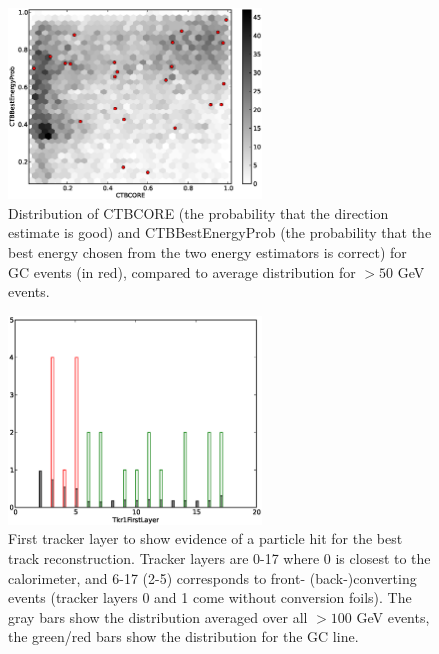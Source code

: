 \documentclass[aps,twocolumn,prd,superscriptaddress,showpacs,nofootinbib,fixfloat]{revtex4}
\begin{document}
\begin{figure}
\centering
\includegraphics[width=0.6\textwidth]{plots/CTBCORE_CTBBestEnergyProb.eps}
\caption{Distribution of CTBCORE (the probability that the direction estimate
is good) and CTBBestEnergyProb (the probability that the best energy chosen
from the two energy estimators is correct) for GC events (in red), compared to
average distribution for $>50$ GeV events.}
\label{fig:CTBquality}
\end{figure}

\begin{figure}
\centering
\includegraphics[width=0.6\textwidth]{plots/Tkr1FirstLayer.eps}
\caption{First tracker layer to show evidence of a particle hit for the best
track reconstruction. Tracker layers are 0-17 where 0 is closest to the
calorimeter, and 6-17 (2-5) corresponds to front- (back-)converting events
(tracker layers 0 and 1 come without conversion foils). The gray bars show the
distribution averaged over all $>100$ GeV events, the green/red bars show the
distribution for the GC line.}
\label{fig:Tkr1FirstLayer}
\end{figure}
\end{document}
